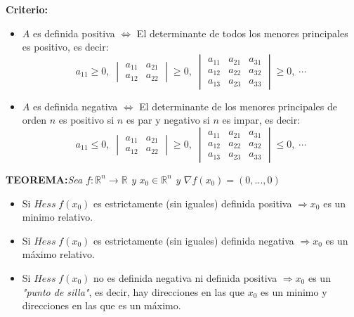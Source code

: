 \documentclass[11pt]{article}
\newcommand{\R}{\mathbb{R}}
\theoremstyle{plain}
\begin{document}
    \textbf{Criterio:}
    \begin{itemize}
        \item $A$ es definida positiva $\Leftrightarrow$ El determinante de todos los menores principales es positivo, es decir:
        \begin{equation}
            a_{11} \ge 0, \;
            \begin{vmatrix}
                a_{11}&a_{21}\\
                a_{12}&a_{22}
            \end{vmatrix}
            \ge 0, \;
            \begin{vmatrix}
                a_{11}&a_{21}&a_{31}\\
                a_{12}&a_{22}&a_{32}\\
                a_{13}&a_{23}&a_{33}
            \end{vmatrix}
            \ge 0, \; \cdots
        \end{equation}
        \item $A$ es definida negativa $\Leftrightarrow$ El determinante de los menores principales de orden $n$ es positivo si $n$ es par y negativo si $n$ es impar, es decir:
        \begin{equation}
            a_{11} \le 0, \;
            \begin{vmatrix}
                a_{11}&a_{21}\\
                a_{12}&a_{22}
            \end{vmatrix}
            \ge 0, \;
            \begin{vmatrix}
                a_{11}&a_{21}&a_{31}\\
                a_{12}&a_{22}&a_{32}\\
                a_{13}&a_{23}&a_{33}
            \end{vmatrix}
            \le 0, \; \cdots
        \end{equation}
    \end{itemize}

    \textbf{TEOREMA:}\textit{Sea $f:\R^n \rightarrow \R$ y $x_0 \in \R^n$ y $\nabla f(x_0) = (0,...,0)$}
    \begin{itemize}
        \item Si $Hess \; f(x_0)$ es estrictamente (sin iguales) definida positiva  $\Rightarrow x_0$ es un minimo relativo.
        \item Si $Hess \; f(x_0)$ es estrictamente (sin iguales) definida negativa $\Rightarrow x_0$ es un máximo relativo.
        \item Si $Hess \; f(x_0)$ no es definida negativa ni definida positiva $\Rightarrow x_0$ es un \textit{"punto de silla"}, es decir, hay direcciones en las que $x_0$ es un minimo y direcciones en las que es un máximo.
    \end{itemize}
\end{document}
